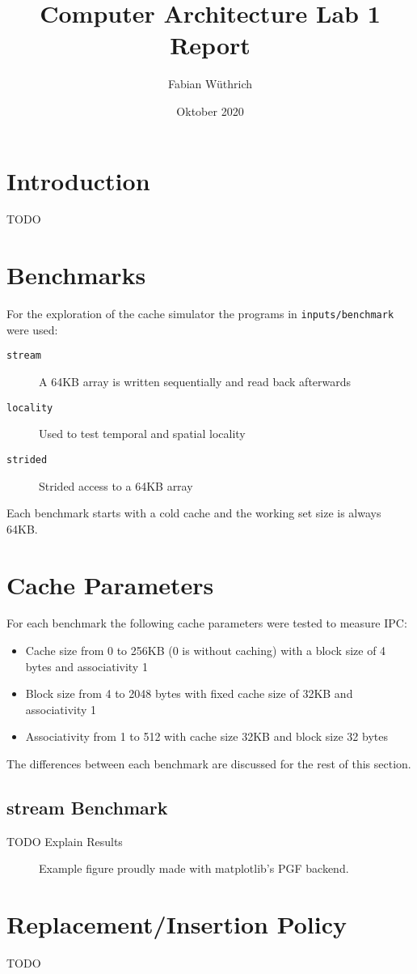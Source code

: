 \documentclass[a4paper]{article}
\begin{document}
\title{Computer Architecture Lab 1 Report}
\author{Fabian Wüthrich}
\date{Oktober 2020}
\maketitle

\section{Introduction}

TODO

\section{Benchmarks}

For the exploration of the cache simulator the programs in
\verb|inputs/benchmark| were used:
\begin{description}
    \item[\texttt{stream}] A 64KB array is written sequentially and read back afterwards
    \item[\texttt{locality}] Used to test temporal and spatial locality
    \item[\texttt{strided}] Strided access to a 64KB array 
\end{description}
Each benchmark starts with a cold cache and the working set size is always 64KB.

\section{Cache Parameters}

For each benchmark the following cache parameters were tested to measure IPC:
\begin{itemize}
    \item Cache size from 0 to 256KB (0 is without caching) with a block size of
        4 bytes and associativity 1
    \item Block size from 4 to 2048 bytes with fixed cache size of 32KB and associativity 1 
    \item Associativity from 1 to 512 with cache size 32KB and block size 32 bytes 
\end{itemize}
The differences between each benchmark are discussed for the rest of this section.

\subsection{stream Benchmark}

TODO Explain Results

\begin{figure}
	\begin{center}
		
	\end{center}
	\caption{Example figure proudly made with matplotlib's PGF backend.}
    \label{fig:stream-benchmark}
\end{figure}

\section{Replacement/Insertion Policy}
TODO
\end{document}
